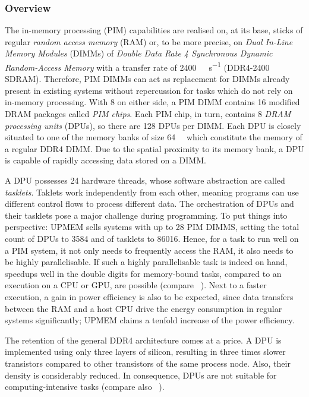 \subsubsection{Overview}
\label{sec:prereq:architecture:overview}

The in-memory processing (PIM) capabilities are realised on, at its base, sticks of regular \emph{random access memory} (RAM) or, to be more precise, on \emph{Dual In-Line Memory Modules} (DIMMs) of \emph{Double Data Rate 4 Synchronous Dynamic Random-Access Memory} with a transfer rate of \qty{2400}{\mega\transfer\per\second} (DDR4-2400 SDRAM).
Therefore, PIM DIMMs can act as replacement for DIMMs already present in existing systems without repercussion for tasks which do not rely on in-memory processing.
With 8 on either side, a PIM DIMM contains 16 modified DRAM packages called \emph{PIM chips}.
Each PIM chip, in turn, contains 8 \emph{DRAM processing units} (DPUs), so there are 128 DPUs per DIMM.
Each DPU is closely situated to one of the memory banks of size \qty{64}{\mebi\byte} which constitute the memory of a regular DDR4 DIMM.
Due to the spatial proximity to its memory bank, a DPU is capable of rapidly accessing data stored on a DIMM.

A DPU possesses 24 hardware threads, whose software abstraction are called \emph{tasklets}.
Taklets work independently from each other, meaning programs can use different control flows to process different data.
The orchestration of DPUs and their tasklets pose a major challenge during programming.
To put things into perspective:
UPMEM sells systems with up to 28 PIM DIMMS, setting the total count of DPUs to \num{3584} and of tasklets to \num{86016}.
Hence, for a task to run well on a PIM system, it not only needs to frequently access the RAM, it also needs to be highly parallelisable.
If such a highly parallelisable task is indeed on hand, speedups well in the double digits for memory-bound tasks, compared to an execution on a CPU or GPU, are possible (compare \citeauthor{mutlu2022Benchmarking}~\cite{mutlu2022Benchmarking}).
Next to a faster execution, a gain in power efficiency is also to be expected, since data transfers between the RAM and a host CPU drive the energy consumption in regular systems significantly;
UPMEM claims a tenfold increase of the power efficiency.

The retention of the general DDR4 architecture comes at a price.
A DPU is implemented using only three layers of silicon, resulting in three times slower transistors compared to other transistors of the same process node.
Also, their density is considerably reduced.
In consequence, DPUs are not suitable for computing-intensive tasks (compare also \citeauthor{mutlu2022Benchmarking}~\cite{mutlu2022Benchmarking}).
